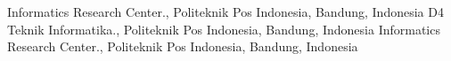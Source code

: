  Informatics Research Center., Politeknik Pos Indonesia, Bandung,
Indonesia
 D4 Teknik Informatika., Politeknik Pos Indonesia, Bandung,
Indonesia
 Informatics Research Center., Politeknik Pos Indonesia, Bandung,
Indonesia